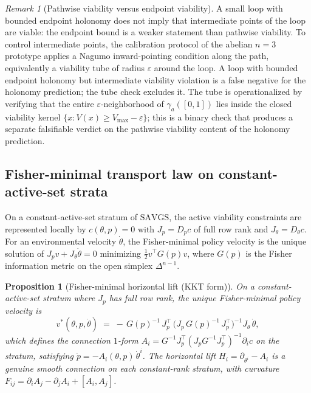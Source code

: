 \documentclass[11pt,a4paper]{article}
\theoremstyle{plain}
\newtheorem{proposition}[theorem]{Proposition}
\theoremstyle{definition}
\theoremstyle{remark}
\newtheorem{remark}[theorem]{Remark}
\newcommand{\SAVGS}{\mathrm{SAVGS}}
\begin{document}
\begin{remark}[Pathwise viability versus endpoint viability]
\label{rem:pathwise}
A small loop with bounded endpoint holonomy does not imply that
intermediate points of the loop are viable: the endpoint bound is a
weaker statement than pathwise viability. To control intermediate
points, the calibration protocol of the abelian $n=3$ prototype
applies a Nagumo inward-pointing condition along the path, equivalently
a viability tube of radius $\varepsilon$ around the loop. A loop with
bounded endpoint holonomy but intermediate viability violation is a
false negative for the holonomy prediction; the tube check excludes
it. The tube is operationalized by verifying that the entire
$\varepsilon$-neighborhood of $\gamma_a([0,1])$ lies inside the
closed viability kernel
$\{x : V(x)\geq V_{\max}-\varepsilon\}$; this is a binary check that
produces a separate falsifiable verdict on the pathwise viability
content of the holonomy prediction.
\end{remark}

\subsection{Fisher-minimal transport law on constant-active-set strata}
\label{sec:fisher-transport}

On a constant-active-set stratum of $\SAVGS$, the active viability
constraints are represented locally by $c(\theta, p) = 0$ with
$J_p = D_p c$ of full row rank and $J_\theta = D_\theta c$. For an
environmental velocity $\dot\theta$, the Fisher-minimal policy
velocity is the unique solution of $J_p v + J_\theta\dot\theta = 0$
minimizing $\tfrac12 v^\top G(p) v$, where $G(p)$ is the Fisher
information metric on the open simplex $\Delta^{n-1}$.

\begin{proposition}[Fisher-minimal horizontal lift (KKT form)]
\label{prop:kkt}
On a constant-active-set stratum where $J_p$ has full row rank, the
unique Fisher-minimal policy velocity is
\begin{equation}\label{eq:kkt}
  v^*(\theta, p, \dot\theta) \;=\;
  -\,G(p)^{-1}\,J_p^{\!\top}\,\bigl(J_p\,G(p)^{-1}\,J_p^{\!\top}\bigr)^{-1}\!J_\theta\,\dot\theta,
\end{equation}
which defines the connection $1$-form
$A_i = G^{-1} J_p^{\!\top}(J_p G^{-1} J_p^{\!\top})^{-1}\partial_i c$
on the stratum, satisfying $\dot p = -A_i(\theta, p)\,\dot\theta^i$.
The horizontal lift $H_i = \partial_{\theta^i} - A_i$ is a genuine
smooth connection on each constant-rank stratum, with curvature
$F_{ij} = \partial_i A_j - \partial_j A_i + [A_i, A_j]$.
\end{proposition}
\end{document}
